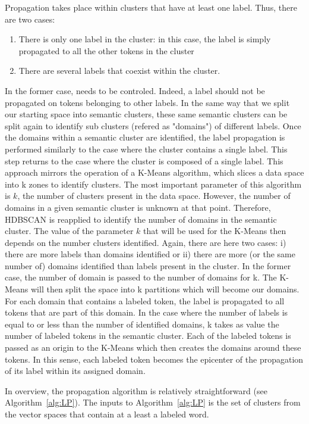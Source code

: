 Propagation takes place within clusters that have at least one label.
Thus, there are two cases:
\begin{enumerate}
    \item There is only one label in the cluster: in this case, the label is simply propagated to all the other tokens in the cluster
    \item There are several labels that coexist within the cluster.
\end{enumerate}

In the former case, needs to be controled.
Indeed, a label should not be propagated on tokens belonging to other labels.
In the same way that we split our starting space into semantic clusters, these same semantic clusters can be split again to identify sub clusters (refered as "domains") of different labels.
Once the domains within a semantic cluster are identified, the label propagation is performed similarly to the case where the cluster contains a single label.
This step returns to the case where the cluster is composed of a single label.
This approach mirrors the operation of a K-Means algorithm, which slices a data space into k zones to identify clusters.
The most important parameter of this algorithm is \(k\), the number of clusters present in the data space.
However, the number of domains in a given semantic cluster is unknown at that point.
Therefore, HDBSCAN is reapplied to identify the number of domains in the semantic cluster.
The value of the parameter \(k\) that will be used for the K-Means then depends on the number clusters identified.
Again, there are here two cases: i) there are more labels than domains identified or
ii) there are more (or the same number of) domains identified than labels present in the cluster.
In the former case, the number of domain is passed to the number of domains for k.
The K-Means will then split the space into k partitions which will become our domains.
For each domain that contains a labeled token, the label is propagated to all tokens that are part of this domain.
In the case where the number of labels is equal to or less than the number of identified domains, k takes as value the number of labeled tokens in the semantic cluster.
Each of the labeled tokens is passed as an origin to the K-Means which then creates the domains around these tokens.
In this sense, each labeled token becomes the epicenter of the propagation of its label within its assigned domain.

In overview, the propagation algorithm is relatively straightforward (see Algorithm~\ref{alg:LP}).
The inputs to Algorithm~\ref{alg:LP} is the set of clusters from the vector spaces that contain
at a least a labeled word.

